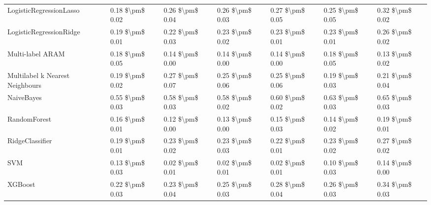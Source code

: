 \begin{tabular}{lllllll}
LogisticRegressionLasso         &  0.18 \$\textbackslash pm\$ 0.02 &           0.26 \$\textbackslash pm\$ 0.04 &       0.26 \$\textbackslash pm\$ 0.03 &        0.27 \$\textbackslash pm\$ 0.05 &                         0.25 \$\textbackslash pm\$ 0.05 &      0.32 \$\textbackslash pm\$ 0.02 \\
LogisticRegressionRidge         &  0.19 \$\textbackslash pm\$ 0.01 &           0.22 \$\textbackslash pm\$ 0.03 &       0.23 \$\textbackslash pm\$ 0.02 &        0.23 \$\textbackslash pm\$ 0.01 &                         0.23 \$\textbackslash pm\$ 0.01 &      0.26 \$\textbackslash pm\$ 0.02 \\
Multi-label ARAM                &  0.18 \$\textbackslash pm\$ 0.05 &           0.14 \$\textbackslash pm\$ 0.00 &       0.14 \$\textbackslash pm\$ 0.00 &        0.14 \$\textbackslash pm\$ 0.00 &                         0.18 \$\textbackslash pm\$ 0.05 &      0.13 \$\textbackslash pm\$ 0.02 \\
Multilabel k Nearest Neighbours &  0.19 \$\textbackslash pm\$ 0.02 &           0.27 \$\textbackslash pm\$ 0.07 &       0.25 \$\textbackslash pm\$ 0.06 &        0.25 \$\textbackslash pm\$ 0.06 &                         0.19 \$\textbackslash pm\$ 0.03 &      0.21 \$\textbackslash pm\$ 0.04 \\
NaiveBayes                      &  0.55 \$\textbackslash pm\$ 0.03 &           0.58 \$\textbackslash pm\$ 0.03 &       0.58 \$\textbackslash pm\$ 0.02 &        0.60 \$\textbackslash pm\$ 0.02 &                         0.63 \$\textbackslash pm\$ 0.03 &      0.65 \$\textbackslash pm\$ 0.03 \\
RandomForest                    &  0.16 \$\textbackslash pm\$ 0.01 &           0.12 \$\textbackslash pm\$ 0.00 &       0.13 \$\textbackslash pm\$ 0.00 &        0.15 \$\textbackslash pm\$ 0.03 &                         0.14 \$\textbackslash pm\$ 0.02 &      0.19 \$\textbackslash pm\$ 0.01 \\
RidgeClassifier                 &  0.19 \$\textbackslash pm\$ 0.01 &           0.23 \$\textbackslash pm\$ 0.02 &       0.23 \$\textbackslash pm\$ 0.03 &        0.22 \$\textbackslash pm\$ 0.01 &                         0.23 \$\textbackslash pm\$ 0.02 &      0.27 \$\textbackslash pm\$ 0.02 \\
SVM                             &  0.13 \$\textbackslash pm\$ 0.03 &           0.02 \$\textbackslash pm\$ 0.01 &       0.02 \$\textbackslash pm\$ 0.01 &        0.02 \$\textbackslash pm\$ 0.01 &                         0.10 \$\textbackslash pm\$ 0.03 &      0.14 \$\textbackslash pm\$ 0.00 \\
XGBoost                         &  0.22 \$\textbackslash pm\$ 0.03 &           0.23 \$\textbackslash pm\$ 0.04 &       0.25 \$\textbackslash pm\$ 0.03 &        0.28 \$\textbackslash pm\$ 0.04 &                         0.26 \$\textbackslash pm\$ 0.03 &      0.34 \$\textbackslash pm\$ 0.03 \\
\bottomrule
\end{tabular}
